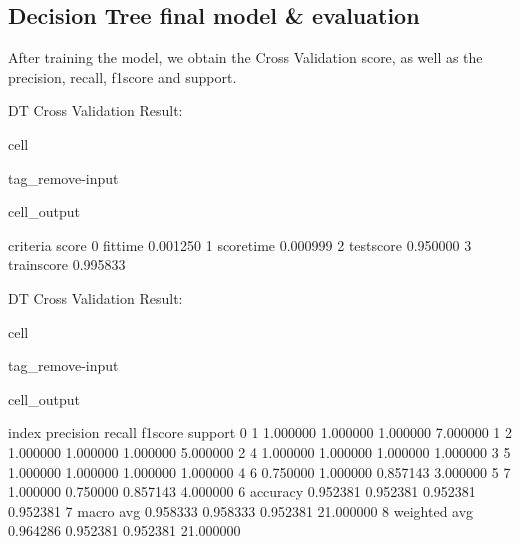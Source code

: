 \documentclass[letterpaper,10pt,english]{jupyterBook}
\begin{document}
\subsection{Decision Tree final model \& evaluation}
\label{\detokenize{analysis:decision-tree-final-model-evaluation}}
\sphinxAtStartPar
After training the model, we obtain the Cross Validation score, as well as the precision, recall, f1\sphinxhyphen{}score and support.

\sphinxAtStartPar
DT Cross Validation Result:

\begin{sphinxuseclass}{cell}
\begin{sphinxuseclass}{tag_remove-input}\begin{sphinxVerbatimOutput}

\begin{sphinxuseclass}{cell_output}
\begin{sphinxVerbatim}[commandchars=\\\{\}]
      criteria     score
0     fit\PYGZus{}time  0.001250
1   score\PYGZus{}time  0.000999
2   test\PYGZus{}score  0.950000
3  train\PYGZus{}score  0.995833
\end{sphinxVerbatim}

\end{sphinxuseclass}\end{sphinxVerbatimOutput}

\end{sphinxuseclass}
\end{sphinxuseclass}
\sphinxAtStartPar
DT Cross Validation Result:

\begin{sphinxuseclass}{cell}
\begin{sphinxuseclass}{tag_remove-input}\begin{sphinxVerbatimOutput}

\begin{sphinxuseclass}{cell_output}
\begin{sphinxVerbatim}[commandchars=\\\{\}]
          index  precision    recall  f1\PYGZhy{}score    support
0             1   1.000000  1.000000  1.000000   7.000000
1             2   1.000000  1.000000  1.000000   5.000000
2             4   1.000000  1.000000  1.000000   1.000000
3             5   1.000000  1.000000  1.000000   1.000000
4             6   0.750000  1.000000  0.857143   3.000000
5             7   1.000000  0.750000  0.857143   4.000000
6      accuracy   0.952381  0.952381  0.952381   0.952381
7     macro avg   0.958333  0.958333  0.952381  21.000000
8  weighted avg   0.964286  0.952381  0.952381  21.000000
\end{sphinxVerbatim}

\end{sphinxuseclass}\end{sphinxVerbatimOutput}

\end{sphinxuseclass}
\end{sphinxuseclass}
\end{document}
